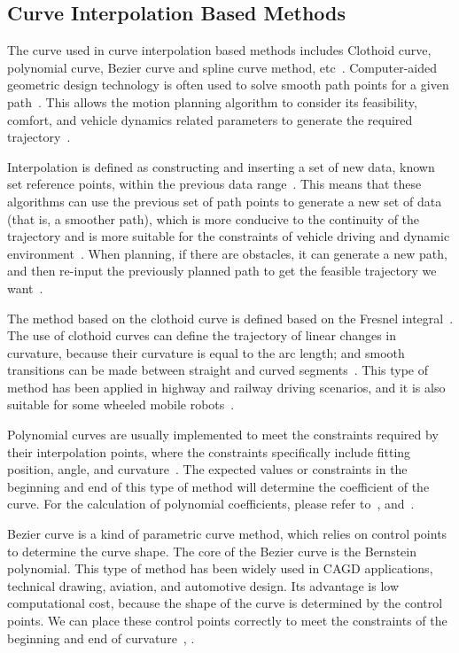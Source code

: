 \documentclass[conference]{IEEEtran}
\begin{document}
\subsection{Curve Interpolation Based Methods}
The curve used in curve interpolation based methods includes Clothoid curve, polynomial curve, Bezier curve and spline curve method, etc~\cite{Brian2016}. Computer-aided geometric design technology is often used to solve smooth path points for a given path~\cite{brezak2013real}.  This allows the motion planning algorithm to consider its feasibility, comfort, and vehicle dynamics related parameters to generate the required trajectory~\cite{brezak2013real}.

Interpolation is defined as constructing and inserting a set of new data, known set reference points, within the previous data range~\cite{gonzalez2015review}. This means that these algorithms can use the previous set of path points to generate a new set of data (that is, a smoother path), which is more conducive to the continuity of the trajectory and is more suitable for the constraints of vehicle driving and dynamic environment~\cite{gonzalez2015review}. When planning, if there are obstacles, it can generate a new path, and then re-input the previously planned path to get the feasible trajectory we want~\cite{gonzalez2015review}.

The method based on the clothoid curve is defined based on the Fresnel integral~\cite{brezak2013real}. The use of clothoid curves can define the trajectory of linear changes in curvature, because their curvature is equal to the arc length; and smooth transitions can be made between straight and curved segments~\cite{brezak2013real}. This type of method has been applied in highway and railway driving scenarios, and it is also suitable for some wheeled mobile robots~\cite{walton2005controlled}.

Polynomial curves are usually implemented to meet the constraints required by their interpolation points, where the constraints specifically include fitting position, angle, and curvature~\cite{gonzalez2015review}. The expected values or constraints in the beginning and end of this type of method will determine the coefficient of the curve. For the calculation of polynomial coefficients, please refer to~\cite{piazzi2002quintic}, \cite{glaser2010maneuver} and~\cite{simon1999vehicle}.


Bezier curve is a kind of parametric curve method, which relies on control points to determine the curve shape. The core of the Bezier curve is the Bernstein polynomial. This type of method has been widely used in CAGD applications, technical drawing, aviation, and automotive design. Its advantage is low computational cost, because the shape of the curve is determined by the control points. We can place these control points correctly to meet the constraints of the beginning and end of curvature~\cite{rastelli2014dynamic}, \cite{choi2008path}.
\end{document}
